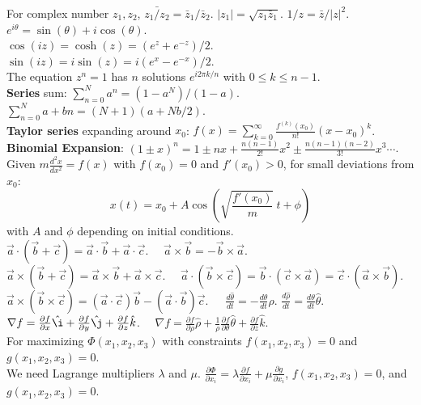 \documentclass[11pt]{article}
\theoremstyle{break}
\theoremstyle{break}
\newcommand{\pd}{\partial}
\newcommand{\ihat}{\hat{\i}}
\newcommand{\jhat}{\hat{\j}}
\newcommand{\khat}{\hat{k}}
\begin{document}
For complex number $z_1,z_2$, $\bar{z_1/z_2} = \bar{z}_1/\bar{z}_2$. $|z_1| = \sqrt{z_1\bar{z}_1}$. $1/z = \bar{z} / |z|^2$. $e^{i\theta} = \sin(\theta) + i \cos(\theta)$. \\
$\cos(iz) = \cosh(z) = (e^z + e^{-z})/2$. $\sin(iz) = i\sin(z) = i (e^x - e^{-x})/2$.\\ The equation $z^n = 1$ has $n$ solutions $e^{i2\pi k/n}$ with $0\leq k \leq n-1$.\\

\textbf{Series} sum: $\sum_{n=0}^N a^n = (1-a^N) / (1-a)$. $\sum_{n=0}^N a+bn = (N+1)(a+Nb/2)$.\\
\textbf{Taylor series} expanding around $x_0$: $f(x) = \sum_{k=0}^\infty \frac{f^{(k)}(x_0)}{n!}(x-x_0)^k$.  \\ 
\textbf{Binomial Expansion}: $(1\pm x)^n = 1\pm n x + \frac{n(n-1)}{2!}x^2\pm \frac{n(n-1)(n-2)}{3!}x^3\cdots$.\\

Given $m\frac{d^2x}{dx^2} = f(x)$ with $f(x_0) = 0$ and $f'(x_0) >0$, for small deviations from $x_0$: $$x(t) = x_0 + A\cos(\sqrt{\frac{f'(x_0)}{m}}\ t+ \phi)$$
with $A$ and $\phi$ depending on initial conditions. \\

$\vec{a}\cdot (\vec{b}+\vec{c}) = \vec{a}\cdot \vec{b}+ \vec{a}\cdot \vec{c}$. \ \ $\vec{a}\times \vec{b} =-\vec{b}\times \vec{a}$. \ \  $\vec{a}\times(\vec{b}+\vec{c}) = \vec{a}\times \vec{b}+ \vec{a}\times \vec{c}$. \ \ $\vec{a}\cdot (\vec{b}\times \vec{c}) = \vec{b}\cdot (\vec{c}\times \vec{a}) = \vec{c}\cdot (\vec{a}\times \vec{b})$.\\
$\vec{a}\times(\vec{b}\times \vec{c}) = (\vec{a}\cdot \vec{c})\vec{b} - (\vec{a}\cdot \vec{b})\vec{c}$.\ \ \ $\frac{d\hat{\theta}}{dt} = -\frac{d\theta}{dt}\hat{\rho}$. $\frac{d\hat{\rho}}{dt} = \frac{d\theta}{dt}\hat{\theta}$. \ \ $\nabla f = \frac{\pd f}{\pd x} \ihat + \frac{\pd f}{\pd y}\jhat + \frac{\pd f}{\pd z}\khat$. \ \ $\nabla f = \frac{\pd f}{\pd \rho}\hat{\rho} + \frac{1}{\rho}\frac{\pd f}{\pd \theta} \hat{\theta} + \frac{\pd f}{\pd z}\hat{k}$.\\

For maximizing $\Phi(x_1,x_2,x_3)$ with constraints $f(x_1,x_2,x_3) = 0$ and $g(x_1,x_2,x_3) = 0$. \\We need Lagrange multipliers $\lambda$ and $\mu$. $\frac{\pd \Phi}{\pd x_i} = \lambda \frac{\pd f}{\pd x_i} + \mu \frac{\pd g}{\pd x_i}$, $f(x_1,x_2,x_3)= 0$, and $g(x_1,x_2,x_3) = 0$. \\
\end{document}
